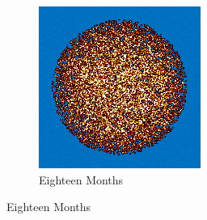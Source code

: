 \begin{figure}[H]
\begin{subfigure}{0.4\textwidth}
  \includegraphics[width=0.95\linewidth]{figures/burn-20-bstep3}
  \caption{Eighteen Months}
  \label{fig:bstep3}
\end{subfigure}%


\end{figure}
